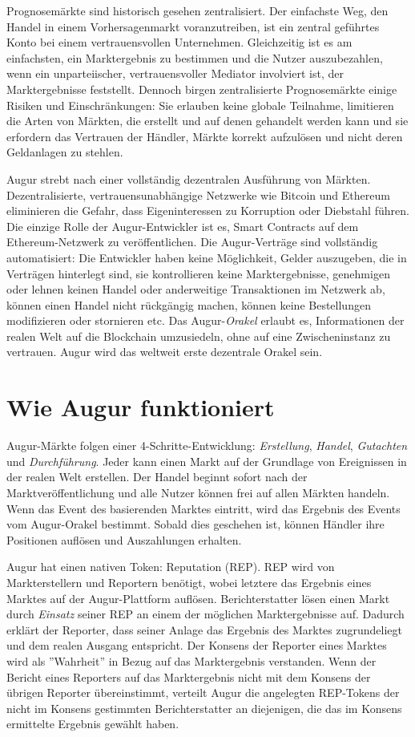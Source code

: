 \documentclass[floatfix,reprint,nofootinbib,amsmath,amssymb,epsfig,pre,floats,letterpaper,groupedaffiliation]{revtex4-1}
\theoremstyle{definition}
\theoremstyle{definition}
\theoremstyle{definition}
\begin{document}
Prognosemärkte sind historisch gesehen zentralisiert. Der einfachste Weg, den Handel in einem Vorhersagenmarkt voranzutreiben, ist ein zentral geführtes Konto bei einem vertrauensvollen Unternehmen. Gleichzeitig ist es am einfachsten, ein Marktergebnis zu bestimmen und die Nutzer auszubezahlen, wenn ein unparteiischer, vertrauensvoller Mediator involviert ist, der Marktergebnisse feststellt. Dennoch birgen zentralisierte Prognosemärkte einige Risiken und Einschränkungen: Sie erlauben keine globale Teilnahme, limitieren die Arten von Märkten, die erstellt und auf denen gehandelt werden kann und sie erfordern das Vertrauen der Händler, Märkte korrekt aufzulösen und nicht deren Geldanlagen zu stehlen.

Augur strebt nach einer vollständig dezentralen Ausführung von Märkten. Dezentralisierte, vertrauensunabhängige Netzwerke wie Bitcoin\cite{Nakamoto_2008} und Ethereum\cite{Buterin_2013} eliminieren die Gefahr, dass Eigeninteressen zu Korruption oder Diebstahl führen. Die einzige Rolle der Augur-Entwickler ist es, Smart Contracts auf dem Ethereum-Netzwerk zu veröffentlichen. Die Augur-Verträge sind vollständig automatisiert: Die Entwickler haben keine Möglichkeit, Gelder auszugeben, die in Verträgen hinterlegt sind, sie kontrollieren keine Marktergebnisse, genehmigen oder lehnen keinen Handel oder anderweitige Transaktionen im Netzwerk ab, können einen Handel nicht rückgängig machen, können keine Bestellungen modifizieren oder stornieren etc. Das Augur-\textit{Orakel} erlaubt es, Informationen der realen Welt auf die Blockchain umzusiedeln, ohne auf eine Zwischeninstanz zu vertrauen. Augur wird das weltweit erste dezentrale Orakel sein.

\section{Wie Augur funktioniert}

Augur-Märkte folgen einer 4-Schritte-Entwicklung: \textit{Erstellung}, \textit{Handel}, \textit{Gutachten} und \textit{Durchführung}. Jeder kann einen Markt auf der Grundlage von Ereignissen in der realen Welt erstellen. Der Handel beginnt sofort nach der Marktveröffentlichung und alle Nutzer können frei auf allen Märkten handeln. Wenn das Event des basierenden Marktes eintritt, wird das Ergebnis des Events vom Augur-Orakel bestimmt. Sobald dies geschehen ist, können Händler ihre Positionen auflösen und Auszahlungen erhalten.

Augur hat einen nativen Token: Reputation (REP). REP wird von Markterstellern und Reportern benötigt, wobei letztere das Ergebnis eines Marktes auf der Augur-Plattform auflösen. Berichterstatter lösen einen Markt durch \textit{Einsatz} seiner REP an einem der möglichen Marktergebnisse auf. Dadurch erklärt der Reporter, dass seiner Anlage das Ergebnis des Marktes zugrundeliegt und dem realen Ausgang entspricht. Der Konsens der Reporter eines Marktes wird als ''Wahrheit'' in Bezug auf das Marktergebnis verstanden. Wenn der Bericht eines Reporters auf das Marktergebnis nicht mit dem Konsens der übrigen Reporter übereinstimmt, verteilt Augur die angelegten REP-Tokens der nicht im Konsens gestimmten Berichterstatter an diejenigen, die das im Konsens ermittelte Ergebnis gewählt haben.
\end{document}
